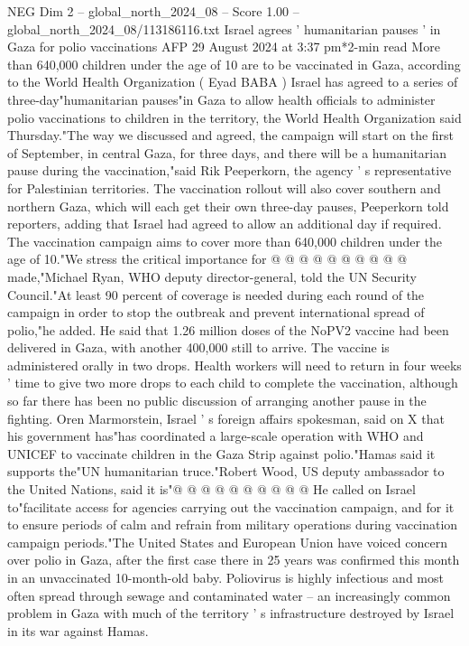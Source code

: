 \begin{textsample}{NEG Dim 2 – global\_north\_2024\_08 – Score 1.00 – global\_north\_2024\_08/113186116.txt}  \label{ex:f2_neg_363}
Israel agrees ' humanitarian pauses ' in Gaza for polio vaccinations AFP 29 August 2024 at 3:37 pm*2-min read More than 640,000 children under the age of 10 are to be vaccinated in Gaza, according to the World Health Organization ( Eyad BABA ) Israel has agreed to a series of three-day"humanitarian pauses"in Gaza to allow health officials to administer polio vaccinations to children in the territory, the World Health Organization said Thursday."The way we discussed and agreed, the campaign will start on the first of September, in central Gaza, for three days, and there will be a humanitarian pause during the vaccination,"said Rik Peeperkorn, the agency ' s representative for Palestinian territories.
The vaccination rollout will also cover southern and northern Gaza, which will each get their own three-day pauses, Peeperkorn told reporters, adding that Israel had agreed to allow an additional day if required.
The vaccination campaign aims to cover more than 640,000 children under the age of 10."We stress the critical importance for @ @ @ @ @ @ @ @ @ @ made,"Michael Ryan, WHO deputy director-general, told the UN Security Council."At least 90 percent of coverage is needed during each round of the campaign in order to stop the outbreak and prevent international spread of polio,"he added.
He said that 1.26 million doses of the NoPV2 vaccine had been delivered in Gaza, with another 400,000 still to arrive.
The vaccine is administered orally in two drops.
Health workers will need to return in four weeks ' time to give two more drops to each child to complete the vaccination, although so far there has been no public discussion of arranging another pause in the fighting.
Oren Marmorstein, Israel ' s foreign affairs spokesman, said on X that his government has"has coordinated a large-scale operation with WHO and UNICEF to vaccinate children in the Gaza Strip against polio."Hamas said it supports the"UN humanitarian truce."Robert Wood, US deputy ambassador to the United Nations, said it is"@ @ @ @ @ @ @ @ @ @ He called on Israel to"facilitate access for agencies carrying out the vaccination campaign, and for it to ensure periods of calm and refrain from military operations during vaccination campaign periods."The United States and European Union have voiced concern over polio in Gaza, after the first case there in 25 years was confirmed this month in an unvaccinated 10-month-old baby.
Poliovirus is highly infectious and most often spread through sewage and contaminated water -- an increasingly common problem in Gaza with much of the territory ' s infrastructure destroyed by Israel in its war against Hamas.

\end{textsample}
